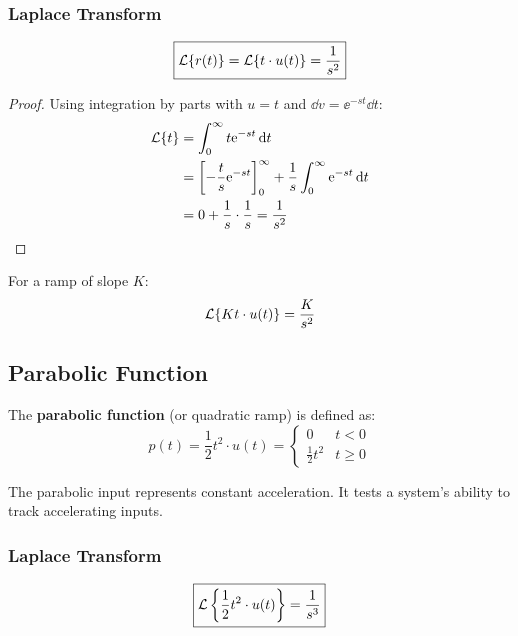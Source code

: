 \subsubsection{Laplace Transform}

\begin{equation}
\boxed{\mathcal{L}\{r(t)\} = \mathcal{L}\{t \cdot u(t)\} = \frac{1}{s^2}}
\end{equation}

\begin{proof}
Using integration by parts with $u = t$ and $\dd v = \ee^{-st}\dd t$:
\begin{align}
\mathcal{L}\{t\} &= \int_0^\infty t\mathrm{e}^{-st} \, \mathrm{d} t \\
&= \left[-\frac{t}{s}\mathrm{e}^{-st}\right]_0^\infty + \frac{1}{s}\int_0^\infty \mathrm{e}^{-st} \, \mathrm{d} t \\
&= 0 + \frac{1}{s} \cdot \frac{1}{s} = \frac{1}{s^2}
\end{align}
\end{proof}

For a ramp of slope $K$:
\begin{equation}
\mathcal{L}\{Kt \cdot u(t)\} = \frac{K}{s^2}
\end{equation}

\subsection{Parabolic Function}

\begin{definitionbox}[title=Definition 10.4: Parabolic Function]
The \textbf{parabolic function} (or quadratic ramp) is defined as:
\begin{equation}
p(t) = \frac{1}{2}t^2 \cdot u(t) = \begin{cases} 0 & t < 0 \\ \frac{1}{2}t^2 & t \geq 0 \end{cases}
\end{equation}
\end{definitionbox}

The parabolic input represents constant acceleration. It tests a system's ability to track accelerating inputs.

\subsubsection{Laplace Transform}

\begin{equation}
\boxed{\mathcal{L}\left\{\frac{1}{2}t^2 \cdot u(t)\right\} = \frac{1}{s^3}}
\end{equation}

